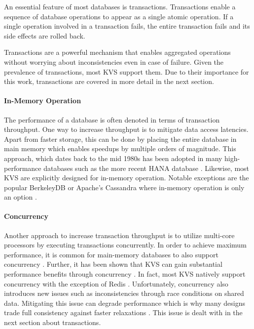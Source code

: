 An essential feature of most databases is transactions. Transactions enable a
sequence of database operations to appear as a single atomic operation. If a
single operation involved in a transaction fails, the entire transaction fails and its side effects are rolled back.

Transactions are a powerful mechanism that enables aggregated operations without
worrying about inconsistencies even in case of failure. Given the prevalence of
transactions, most KVS support them. Due to their importance for this work,
transactions are covered in more detail in the next section.

\paragraph{In-Memory Operation}

The performance of a database is often denoted in terms of transaction
throughput. One way to increase throughput is to mitigate data access latencies.
Apart from faster storage, this can be done by placing the entire database in
main memory which enables speedups by multiple orders of magnitude. This
approach, which dates back to the mid 1980s has been adopted in many
high-performance databases such as the more recent HANA database
\cite{molina1992main, faerber2012hana}. Likewise, most KVS are explicitly
designed for in-memory operation. Notable exceptions are the popular BerkeleyDB
or Apache's Cassandra where in-memory operation is only an option
\cite{bdb2017doc, lakshman2010cassandra}.

\paragraph{Concurrency}

Another approach to increase transaction throughput is to utilize multi-core
processors by executing transactions concurrently. In order to achieve maximum
performance, it is common for main-memory databases to also support concurrency
\cite{grund2010hyrise, faerber2012hana, diaconu2013hekaton}. Further, it has
been shown that KVS can gain substantial performance benefits through
concurrency \cite{fan2013memc3, li2015architecting, xu2014building}. In fact,
most KVS natively support concurrency with the exception of Redis
\cite{redis2017home}. Unfortunately, concurrency also introduces new issues such
as inconsistencies through race conditions on shared data. Mitigating this issue
can degrade performance which is why many designs trade full consistency against
faster relaxations \cite{decandia2007dynamo}. This issue is dealt with in the
next section about transactions.

